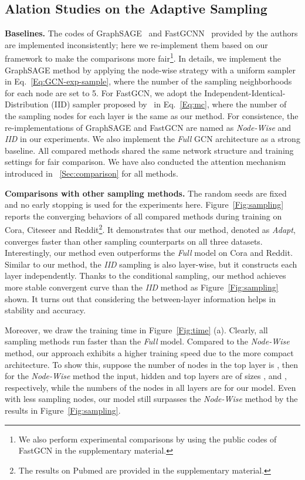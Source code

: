 \documentclass{article}
\begin{document}
\subsection{Alation Studies on the Adaptive Sampling}
\textbf{Baselines.}
The codes of GraphSAGE~\cite{hamilton2017inductive} and FastGCNN~\cite{chen2018fastgcn} provided by the authors are implemented inconsistently; here we re-implement them based on our framework to make the comparisons more fair\footnote{We also perform experimental comparisons by using the public codes of FastGCN in the supplementary material.}. In details, we implement the GraphSAGE method by applying the node-wise strategy with a uniform sampler in Eq.~\eqref{Eq:GCN-exp-sample}, where the number of the sampling neighborhoods for each node are set to 5. For FastGCN, we adopt the Independent-Identical-Distribution (IID) sampler proposed by~\cite{chen2018fastgcn} in Eq.~\eqref{Eq:mc}, where the number of the sampling nodes for each layer is the same as our method. For consistence, the re-implementations of GraphSAGE and FastGCN are named as \emph{Node-Wise} and \emph{IID} in our experiments. We also implement the \emph{Full} GCN architecture as a strong baseline. All compared methods shared the same network structure and training settings for fair comparison. We have also conducted the attention mechanism introduced in \textsection~\ref{Sec:comparison} for all methods.


\textbf{Comparisons with other sampling methods.}
The random seeds are fixed and no early stopping is used for the experiments here.
Figure~\ref{Fig:sampling} reports the converging behaviors of all compared methods during training on Cora, Citeseer and Reddit\footnote{The results on Pubmed are provided in the supplementary material.}. It demonstrates that our method, denoted as \emph{Adapt}, converges faster than other sampling counterparts on all three datasets. Interestingly, our method even outperforms the \emph{Full} model on Cora and Reddit. Similar to our method, the \emph{IID} sampling is also layer-wise, but it constructs each layer independently.
Thanks to the conditional sampling, our method achieves more stable convergent curve than the \emph{IID} method as Figure~\ref{Fig:sampling} shown. It turns out that considering the between-layer information helps in stability and accuracy.

Moreover, we draw the training time in Figure~\ref{Fig:time} (a). Clearly, all sampling methods run faster than the \emph{Full} model.
Compared to the \emph{Node-Wise} method, our approach exhibits a higher training speed due to the more compact architecture. To show this, suppose the number of nodes in the top layer is , then for the \emph{Node-Wise} method the input, hidden and top layers are of sizes ,  and , respectively, while the numbers of the nodes in all layers are  for our model. Even with less sampling nodes, our model still surpasses the \emph{Node-Wise} method by the results in Figure~\ref{Fig:sampling}.
\end{document}
